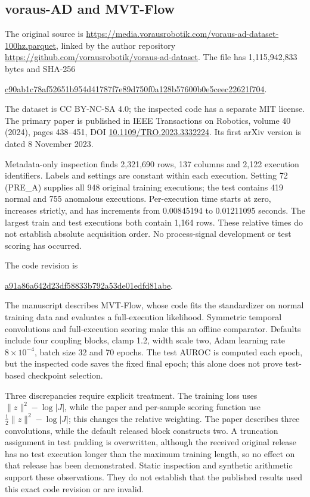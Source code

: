 \documentclass[11pt]{article}
\begin{document}
\subsection{voraus-AD and MVT-Flow}
The original source is \url{https://media.vorausrobotik.com/voraus-ad-dataset-100hz.parquet}, linked by the author repository \url{https://github.com/vorausrobotik/voraus-ad-dataset}. The file has 1,115,942,833 bytes and SHA-256
\begin{center}\small\url{c90ab1c78af52651b954d41787f7e89d750f0a128b57600b0e5ceec22621f704}.\end{center}
The dataset is CC BY-NC-SA 4.0; the inspected code has a separate MIT license. The primary paper is published in IEEE Transactions on Robotics, volume 40 (2024), pages 438--451, DOI \url{10.1109/TRO.2023.3332224}. Its first arXiv version is dated 8 November 2023.

Metadata-only inspection finds 2,321,690 rows, 137 columns and 2,122 execution identifiers. Labels and settings are constant within each execution. Setting 72 (PRE\_A) supplies all 948 original training executions; the test contains 419 normal and 755 anomalous executions. Per-execution time starts at zero, increases strictly, and has increments from 0.00845194 to 0.01211095 seconds. The largest train and test executions both contain 1,164 rows. These relative times do not establish absolute acquisition order. No process-signal development or test scoring has occurred.

The code revision is
\begin{center}\small\url{a91a86a642d23df58833b792a53de01edfd81abe}.\end{center}
The manuscript describes MVT-Flow, whose code fits the standardizer on normal training data and evaluates a full-execution likelihood. Symmetric temporal convolutions and full-execution scoring make this an offline comparator. Defaults include four coupling blocks, clamp 1.2, width scale two, Adam learning rate $8\times10^{-4}$, batch size 32 and 70 epochs. The test AUROC is computed each epoch, but the inspected code saves the fixed final epoch; this alone does not prove test-based checkpoint selection.

Three discrepancies require explicit treatment. The training loss uses $\|z\|^2-\log|J|$, while the paper and per-sample scoring function use $\tfrac12\|z\|^2-\log|J|$; this changes the relative weighting. The paper describes three convolutions, while the default released block constructs two. A truncation assignment in test padding is overwritten, although the received original release has no test execution longer than the maximum training length, so no effect on that release has been demonstrated. Static inspection and synthetic arithmetic support these observations. They do not establish that the published results used this exact code revision or are invalid.
\end{document}
